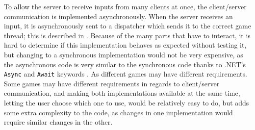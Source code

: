 To allow the server to receive inputs from many clients at once, the client/server communication is implemented asynchronously. When the server receives an input, it is asynchronously sent to a dispatcher which sends it to the correct game thread; this is described in . Because of the many parts that have to interact, it is hard to determine if this implementation behaves as expected without testing it, but changing to a synchronous implementation would not be very expensive, as the asynchronous code is very similar to the synchronous code thanks to .NET's \texttt{Async} and \texttt{Await} keywords \cite{ms-asyn}. As different games may have different requirements. Some games may have different requirements in regards to client/server communication, and making both implementations available at the same time, letting the user choose which one to use, would be relatively easy to do, but adds some extra complexity to the code, as changes in one implementation would require similar changes in the other. 



%
%

